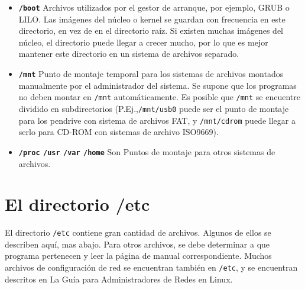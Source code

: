 \documentclass[12pt]{article}
\begin{document}
\begin{itemize}
	
	\item \textbf{\texttt{/boot}}
	 Archivos utilizados por el gestor de arranque, por
	ejemplo, GRUB o LILO. Las imágenes del núcleo o kernel se guardan con
	frecuencia en este directorio, en vez de en el directorio raíz. Si
	existen	muchas imágenes del núcleo, el directorio puede
	llegar a crecer mucho, por lo que es mejor mantener este
	directorio en un sistema de archivos separado. 
	
	\item \textbf{\texttt{/mnt}}
	 Punto de montaje temporal para los sistemas de archivos
	montados manualmente por el administrador del sistema. Se supone que los programas
	no deben montar en \texttt{/mnt} automáticamente. Es posible
	que \texttt{/mnt} se encuentre dividido en subdirectorios
	(P.Ej.,\texttt{/mnt/usb0} puede ser
	el punto de montaje para los pendrive con sistema de archivos
	FAT, y \texttt{/mnt/cdrom} puede llegar a serlo para CD-ROM con sistemas
	de archivo ISO9669).  
	
	\item \textbf{\texttt{/proc}
	\texttt{/usr} \texttt{/var}
	\texttt{/home} } Son Puntos de
	montaje para otros sistemas de archivos.
 \end{itemize}  




\section{ El directorio /etc}

 El directorio \texttt{/etc} contiene gran cantidad de
archivos. Algunos de ellos se describen aquí, mas abajo. Para otros archivos, se
debe determinar a que programa pertenecen y leer la página de manual
correspondiente.  Muchos archivos de configuración de red se encuentran también
en \texttt{/etc}, y se encuentran descritos en La Guía para
Administradores de Redes en Linux.  
\end{document}
